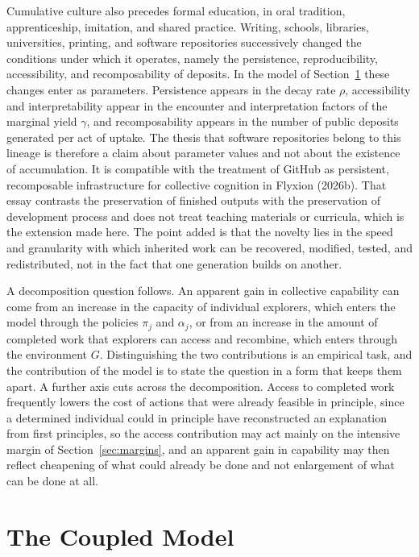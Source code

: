 \documentclass[11pt]{article}
\theoremstyle{definition}
\theoremstyle{remark}
\begin{document}
Cumulative culture also precedes formal education, in oral tradition, apprenticeship, imitation, and shared practice. Writing, schools, libraries, universities, printing, and software repositories successively changed the conditions under which it operates, namely the persistence, reproducibility, accessibility, and recomposability of deposits. In the model of Section~\ref{sec:model} these changes enter as parameters. Persistence appears in the decay rate $\rho$, accessibility and interpretability appear in the encounter and interpretation factors of the marginal yield $\gamma$, and recomposability appears in the number of public deposits generated per act of uptake. The thesis that software repositories belong to this lineage is therefore a claim about parameter values and not about the existence of accumulation. It is compatible with the treatment of GitHub as persistent, recomposable infrastructure for collective cognition in Flyxion (2026b). That essay contrasts the preservation of finished outputs with the preservation of development process and does not treat teaching materials or curricula, which is the extension made here. The point added is that the novelty lies in the speed and granularity with which inherited work can be recovered, modified, tested, and redistributed, not in the fact that one generation builds on another.

A decomposition question follows. An apparent gain in collective capability can come from an increase in the capacity of individual explorers, which enters the model through the policies $\pi_j$ and $\alpha_j$, or from an increase in the amount of completed work that explorers can access and recombine, which enters through the environment $G$. Distinguishing the two contributions is an empirical task, and the contribution of the model is to state the question in a form that keeps them apart. A further axis cuts across the decomposition. Access to completed work frequently lowers the cost of actions that were already feasible in principle, since a determined individual could in principle have reconstructed an explanation from first principles, so the access contribution may act mainly on the intensive margin of Section~\ref{sec:margins}, and an apparent gain in capability may then reflect cheapening of what could already be done and not enlargement of what can be done at all.

\section{The Coupled Model}\label{sec:model}
\end{document}
